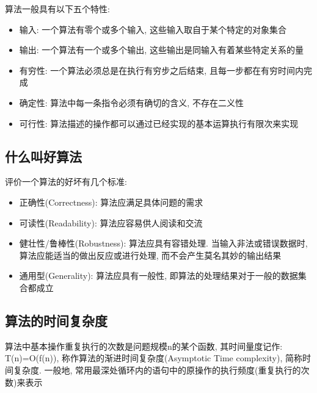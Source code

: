 \documentclass{article}
\begin{document}
算法一般具有以下五个特性:
\begin{itemize}
    \item 输入: 一个算法有零个或多个输入, 这些输入取自于某个特定的对象集合
    \item 输出: 一个算法有一个或多个输出, 这些输出是同输入有着某些特定关系的量
    \item 有穷性: 一个算法必须总是在执行有穷步之后结束, 且每一步都在有穷时间内完成
    \item 确定性: 算法中每一条指令必须有确切的含义, 不存在二义性
    \item 可行性: 算法描述的操作都可以通过已经实现的基本运算执行有限次来实现
\end{itemize}
\subsection{ 什么叫好算法}
评价一个算法的好坏有几个标准:
\begin{itemize}
    \item 正确性(Correctness): 算法应满足具体问题的需求
    \item 可读性(Readability): 算法应容易供人阅读和交流
    \item 健壮性/鲁棒性(Robustness): 算法应具有容错处理. 当输入非法或错误数据时, 算法应能适当的做出反应或进行处理, 而不会产生莫名其妙的输出结果
    \item 通用型(Generality): 算法应具有一般性, 即算法的处理结果对于一般的数据集合都成立
\end{itemize}
\subsection{ 算法的时间复杂度}
算法中基本操作重复执行的次数是问题规模n的某个函数, 其时间量度记作: T(n)=O(f(n)), 称作算法的渐进时间复杂度(Asymptotic Time complexity), 简称时间复杂度. 一般地, 常用最深处循环内的语句中的原操作的执行频度(重复执行的次数)来表示
\end{document}
